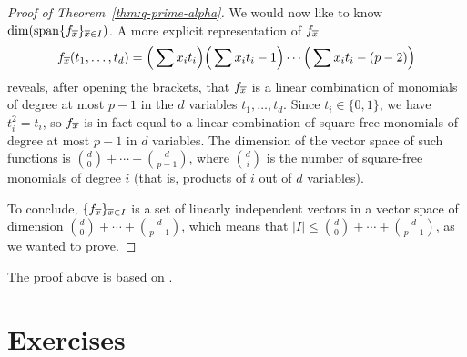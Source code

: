 \begin{proof}[Proof of Theorem~\ref{thm:q-prime-alpha}]
\smallskip
We would now like to know $\dim(\mathrm{span}\{f_{\overline{x}}\}_{\overline{x}\in I})$. A more explicit representation of $f_{\overline{x}}$
$$f_{\overline{x}}(t_1,\ldots,t_d)=\Big(\sum x_it_i\Big)\Big(\sum x_it_i-1\Big)\cdots\Big(\sum x_it_i-(p-2)\Big)$$
reveals, after opening the brackets, that $f_{\overline{x}}$ is a linear combination of monomials of degree at most $p-1$ in the $d$ variables $t_1,\ldots,t_d$. Since $t_i\in\{0,1\}$, we have $t_i^2=t_i$, so $f_{\overline{x}}$ is in fact equal to a linear combination of square-free monomials of degree at most $p-1$ in $d$ variables. The dimension of the vector space of such functions is ${d\choose 0}+\cdots+{d\choose p-1}$, where ${d\choose i}$ is the number of square-free monomials of degree $i$ (that is, products of $i$ out of $d$ variables).

\smallskip
To conclude, $\{f_{\overline{x}}\}_{\overline{x}\in I}$ is a set of linearly independent vectors in a vector space of dimension ${d\choose 0}+\cdots+{d\choose p-1}$, which means that $|I|\leq {d\choose 0}+\cdots+{d\choose p-1}$, as we wanted to prove.
\end{proof}

\begin{remark}
The proof above is based on \cite[Chapter 17]{matousek}.
\end{remark}


\section{Exercises}


